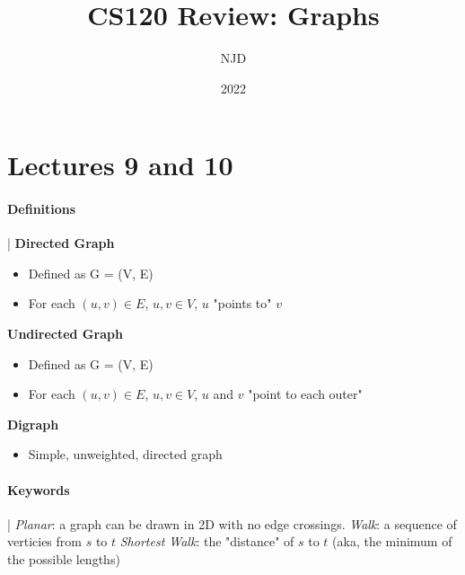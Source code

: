 \documentclass{article}
\title{CS120 Review: Graphs}
\author{NJD}
\date{2022}
\begin{document}
\maketitle

\section*{Lectures 9 and 10}
\paragraph*{Definitions} |
\newline
\newline
\textbf{Directed Graph}
\begin{itemize}
  \item Defined as G = (V, E)
  \item For each $(u, v) \in E$, $u, v \in V$, $u$ "points to" $v$
\end{itemize}
\textbf{Undirected Graph} 
\begin{itemize}
  \item Defined as G = (V, E)
  \item For each $(u, v) \in E$, $u, v \in V$, $u$ and $v$ "point to each outer"
\end{itemize}
\textbf{Digraph}
\begin{itemize}
  \item Simple, unweighted, directed graph
\end{itemize}
\paragraph*{Keywords} |
\newline
\newline
\emph{Planar}: a graph can be drawn in 2D with no edge crossings.
\newline
\newline
\emph{Walk}: a sequence of verticies from $s$ to $t$
\newline
\newline
\emph{Shortest Walk}: the "distance" of $s$ to $t$ (aka, the minimum of the possible lengths)
\end{document}
